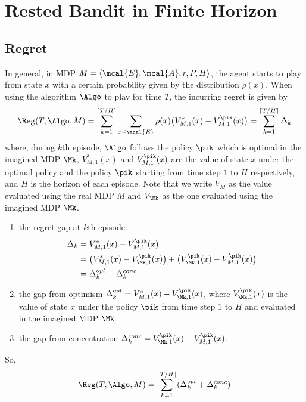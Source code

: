 \chapter{Rested Bandit in Finite Horizon}
\label{ch:rested_bandit}

    \section{Regret}
    \label{sec:regret}
    
        In general, in MDP $M=\langle\mcal{E},\mcal{A},r,P,H\rangle$, the agent starts to play from state $x$ with a certain probability given by the distribution $\rho(x)$. When using the algorithm $\Algo$ to play for time $T$, the incurring regret is given by
        \begin{align}
        \Reg(T,\Algo,M)=\sum_{k=1}^{\lceil T/H\rceil}\sum_{x\in\mcal{E}}\rho(x)\big(V_{M,1}^*(x) -V_{M,1}^{\pik}(x)\big) =\sum_{k=1}^{\lceil T/H\rceil}\Delta_k
        \end{align}
        where, during $k$th episode, $\Algo$ follows the policy $\pik$ which is optimal in the imagined MDP $\Mk$, $V^*_{M,1}(x)$ and $V_{M,1}^{\pik}(x)$ are the value of state $x$ under the optimal policy and the policy $\pik$ starting from time step $1$ to $H$ respectively, and $H$ is the horizon of each episode.
        Note that we write $V_M$ as the value evaluated using the real MDP $M$ and $V_{\Mk}$ as the one evaluated using the imagined MDP $\Mk$.
        
        \begin{enumerate}
        \item the regret gap at $k$th episode:
        \begin{align*}
        \Delta_k &=V_{M,1}^*(x) -V_{M,1}^{\pik}(x) \\
        &=\big(V^*_{M,1}(x) -V^{\pik}_{\Mk,1}(x)\big) +\big(V^{\pik}_{\Mk,1}(x) -V_{M,1}^{\pik}(x)\big) \\
        &=\Delta_k^{opt}+\Delta_k^{conc}
        \end{align*}
        \item the gap from optimism $\Delta_k^{opt}=V^*_{M,1}(x) -V^{\pik}_{\Mk,1}(x)$, where $V^{\pik}_{\Mk,1}(x)$ is the value of state $x$ under the policy $\pik$ from time step $1$ to $H$ and evaluated in the imagined MDP $\Mk$
        \item the gap from concentration $\Delta_k^{conc}=V^{\pik}_{\Mk,1}(x) -V_{M,1}^{\pik}(x)$.
        \end{enumerate}
        So,
        \begin{equation}
        \label{eq:eq_6}
        \Reg(T,\Algo,M)= \sum_{k=1}^{\lceil T/H\rceil}(\Delta_k^{opt}+\Delta_k^{conc})
        \end{equation}
    
